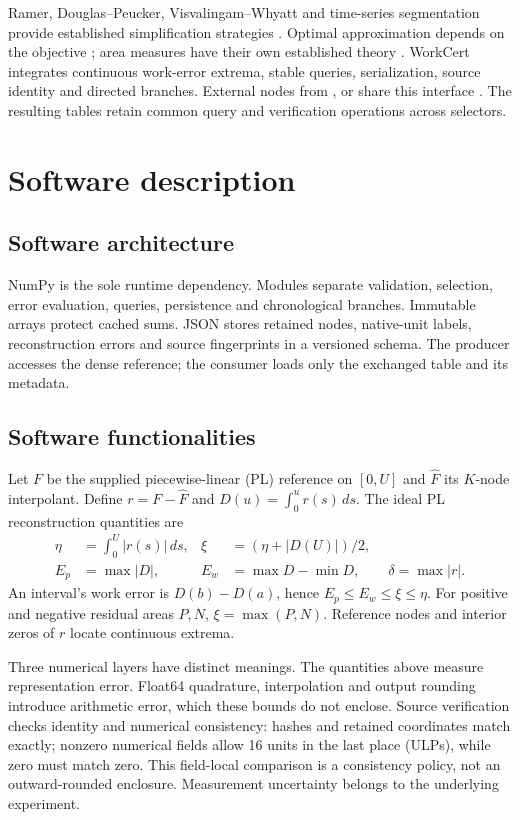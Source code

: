 \documentclass[preprint,12pt,a4paper]{elsarticle}
\begin{document}
Ramer, Douglas--\allowbreak Peucker, Visvalingam--\allowbreak Whyatt and time-series segmentation provide established simplification strategies \cite{Ramer1972,DouglasPeucker1973,Visvalingam1993,Keogh2001}. Optimal approximation depends on the objective \cite{Imai1988}; area measures have their own established theory \cite{Bose2006,Daneshpajouh2012}. WorkCert integrates continuous work-error extrema, stable queries, serialization, source identity and directed branches. External nodes from ,  or  share this interface \cite{rdpSoftware,Hugel2021,ShapelySoftware}. The resulting tables retain common query and verification operations across selectors.

\section{Software description}
\subsection{Software architecture}
NumPy is the sole runtime dependency. Modules separate validation, selection, error evaluation, queries, persistence and chronological branches. Immutable arrays protect cached sums. JSON stores retained nodes, native-unit labels, reconstruction errors and source fingerprints in a versioned schema. The producer accesses the dense reference; the consumer loads only the exchanged table and its metadata.

\subsection{Software functionalities}
Let $F$ be the supplied piecewise-linear (PL) reference on $[0,U]$ and $\widehat F$ its $K$-node interpolant. Define $r=F-\widehat F$ and $D(u)=\int_0^u r(s)\,ds$. The ideal PL reconstruction quantities are
\begin{align}
\eta&=\int_0^U|r(s)|\,ds,&\xi&=(\eta+|D(U)|)/2,\\
E_p&=\max|D|,&E_w&=\max D-\min D,\qquad\delta=\max|r|.
\end{align}
An interval's work error is $D(b)-D(a)$, hence $E_p\leq E_w\leq\xi\leq\eta$. For positive and negative residual areas $P,N$, $\xi=\max(P,N)$. Reference nodes and interior zeros of $r$ locate continuous extrema.

Three numerical layers have distinct meanings. The quantities above measure representation error. Float64 quadrature, interpolation and output rounding introduce arithmetic error, which these bounds do not enclose. Source verification checks identity and numerical consistency: hashes and retained coordinates match exactly; nonzero numerical fields allow 16 units in the last place (ULPs), while zero must match zero. This field-local comparison is a consistency policy, not an outward-rounded enclosure. Measurement uncertainty belongs to the underlying experiment.
\end{document}
